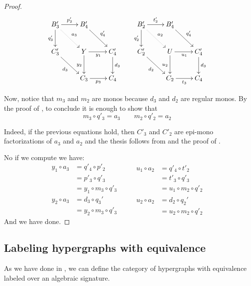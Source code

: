 \documentclass[a4paper,UKenglish,cleveref,pdftex,thm-restate,numberwithinsect]{lipics-v2021}
\def\C{\textbf {\textup{C}}}
\begin{document}
\begin{proof}
	\[\xymatrix{B'_3 \ar@{.>}[dr]^{a_3} \ar[r]^{p'_2} \ar[d]_{q'_3} &B'_4\ar[dr]^{q'_4}&& B'_2\ar@{.>}[dr]^{a_2} \ar[r]^{t'_2} \ar[d]_{q'_2} &B'_4\ar[dr]^{q'_4}\\C'_3 \ar[dr]_{d_3} &Y \ar[r]_{y_1} \ar[d]_{y_2}& C'_4\ar[d]^{d_3}&C_2' \ar[dr]_{d_2}& U \ar[d]_{u_2}\ar[r]_{u_1}& C'_4 \ar[d]^{d_3}\\&C_3 \ar[r]_{p_3}& C_4 &&C_2 \ar[r]_{t_3}& C_4 }\]
	
	Now, notice that  $m_3$ and $m_2$ are monos because $d_3$ and $d_2$ are regular monos. By the proof of , to conclude it is enough to show that
	\[m_3\circ q'_3 = a_3 \qquad m_2\circ q'_2=a_2\]
	
	Indeed, if the previous equations hold, then $C'_3$ and $C'_2$ are epi-mono factorizations of $a_3$ and $a_2$ and the thesis follows from  and the proof of .
	
	No if we compute we have:
	\[\begin{split}
		y_1\circ a_3&= q'_4\circ p'_2\\&=p'_3 \circ q'_3\\&=y_1\circ m_3\circ q'_3  
	\end{split}\qquad \begin{split}
		u_1\circ a_2&= q'_4\circ t'_2\\&=t'_3 \circ q'_3\\&=u_1\circ m_2\circ q'_2  
	\end{split}\]
	\[\begin{split}
		y_2\circ a_3&= d_3\circ q_3'\\&=y_2\circ m_3\circ q'_3
	\end{split}\qquad \begin{split}
		u_2\circ a_2&= d_2\circ q_2'\\&=u_2\circ m_2\circ q'_2
	\end{split}\]
	And we have done.
\end{proof} 


%
%

\subsection{Labeling hypergraphs with equivalence}

As we have done in , we can define the category of hypergraphs with equivalence labeled over an algebraic signature.
\end{document}
